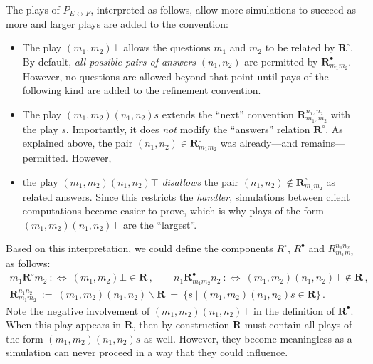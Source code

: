 \documentclass[acmsmall,screen,review,nonacm]{acmart}
\begin{document}
The plays of $P_{E \leftrightarrow F}$, interpreted as follows,
allow more simulations to succeed as
more and larger plays are added to the convention:
\begin{itemize}
  \item The play $(m_1, m_2)\bot$
    allows the questions $m_1$ and $m_2$
    to be related by $\mathbf{R}^\circ$.
    By default,
    \emph{all possible pairs of answers} $(n_1, n_2)$
    are permitted by $\mathbf{R}^\bullet_{m_1m_2}$.
    However, no questions are allowed beyond that point
    until pays of the following kind are added to the refinement convention.
  \item The play $(m_1, m_2)(n_1,n_2) s$
    extends the ``next'' convention $\mathbf{R}^{n_1,n_2}_{m_1,m_2}$
    with the play $s$.
    Importantly, it does \emph{not} modify
    the ``answers'' relation $\mathbf{R}^\circ$.
    As explained above, the pair $(n_1, n_2) \in \mathbf{R}^\circ_{m_1m_2}$
    was already---and remains---permitted.
    However,
  \item the play $(m_1,m_2)(n_1,n_2) \top$ \emph{disallows} the pair
    $(n_1, n_2) \notin \mathbf{R}^\circ_{m_1m_2}$ as related answers.
    Since this restricts the \emph{handler},
    simulations between client computations become easier to prove,
    which is why plays of the form $(m_1,m_2)(n_1,n_2)\top$ are the ``largest''.
\end{itemize}
Based on this interpretation,
we could define the components $R^\circ$, $R^\bullet$
and $R_{m_1m_2}^{n_1n_2}$ as follows:
\begin{gather*}
  m_1 \mathrel{\mathbf{R}^\circ} m_2 \::\Leftrightarrow\:
    (m_1,m_2)\bot \in \mathbf{R}
  \,, \qquad
  n_1 \mathrel{\mathbf{R}^\bullet_{m_1m_2}} n_2 \::\Leftrightarrow\:
    (m_1,m_2)(n_1,n_2)\top \notin \mathbf{R}
  \,, \\[0.5ex]
  \mathbf{R}_{m_1m_2}^{n_1n_2} \: := \:
    (m_1,m_2)(n_1,n_2) \backslash \mathbf{R} \: = \:
    \{ s \mid (m_1,m_2)(n_1,n_2)s \in \mathbf{R} \}
  \,.
\end{gather*}
Note the negative involvement of $(m_1,m_2)(n_1,n_2)\top$
in the definition of $\mathbf{R}^\bullet$.
When this play appears in $\mathbf{R}$,
then by construction $\mathbf{R}$ must contain
all plays of the form $(m_1,m_2)(n_1,n_2)s$ as well.
However, they become meaningless
as a simulation can never proceed
in a way that they could influence.
\end{document}
